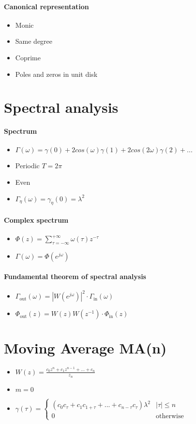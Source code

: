 \documentclass{article}
\begin{document}
\paragraph{Canonical representation}
\begin{itemize}
\item Monic
\item Same degree
\item Coprime
\item Poles and zeros in unit disk
\end{itemize}
\section{Spectral analysis}
\paragraph{Spectrum}
\begin{itemize}
\item $\Gamma(\omega)=\gamma(0)+2cos(\omega)\gamma(1)+2cos(2\omega)\gamma(2)+...$
\item Periodic $T=2\pi$
\item Even
\item $\Gamma_\eta(\omega)=\gamma_\eta(0)=\lambda^2$
\end{itemize}
\paragraph{Complex spectrum}
\begin{itemize}
\item $\Phi(z)=\sum_{\tau =-\infty}^{+\infty} \omega(\tau)z^{-\tau}$
\item $\Gamma(\omega)=\Phi(e^{j\omega})$
\end{itemize}
\paragraph{Fundamental theorem of spectral analysis}
\begin{itemize}
\item $\Gamma_{\text{out}}(\omega)=|W(e^{j\omega})|^2 \cdot \Gamma_{\text{in}}(\omega)$
\item $\Phi_{\text{out}}(z)=W(z)W(z^{-1}) \cdot \Phi_{\text{in}}(z)$
\end{itemize}
\section{Moving Average MA(n)}
\begin{itemize}
\item $W(z)=\frac{c_0z^n+c_1z^{n-1}+...+c_n}{z_n}$
\item $m=0$
\item $\gamma(\tau)= 
\begin{cases}
(c_0c_\tau+c_1c_{1+\tau}+...+c_{n-\tau}c_\tau)\lambda^2	&	|\tau|\leq n\\
0	& \text{otherwise}
\end{cases}$
\end{itemize}
\end{document}
